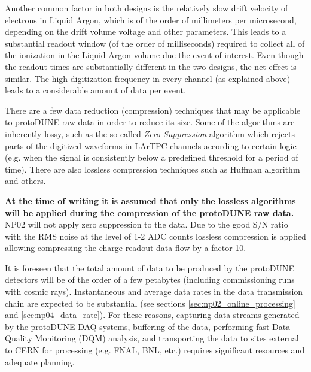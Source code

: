 \documentclass[12pt]{article}
\newcommand{\pd}{protoDUNE\xspace}
\begin{document}
\noindent
Another common factor in both designs is the relatively slow drift velocity of electrons in Liquid Argon, which is of the order of millimeters per microsecond,
depending on the drift volume voltage and other parameters. This leads to a substantial readout window (of the order of milliseconds) required to collect
all of the ionization in the Liquid Argon volume due the event of interest. Even though the readout times are substantially different in the two designs,
the net effect is similar. The high digitization frequency in every channel (as explained above) leads to a considerable amount of data per event.

There are a few data reduction (compression) techniques that may be applicable to \pd raw data in order to reduce its size. Some of the algorithms
are inherently lossy, such as the so-called \textit{Zero Suppression} algorithm which rejects parts of the digitized waveforms in LArTPC channels according
to certain logic (e.g. when the signal is consistently below a predefined threshold for a period of time). There are also lossless compression
techniques such as Huffman algorithm and others.

\textbf{At the time of writing it is assumed that only the lossless algorithms will be applied during the compression
of the \pd raw data.}
NP02 will not apply  zero suppression to the data. Due to the good S/N ratio with the RMS noise at the level of 1-2 ADC counts lossless compression is applied 
allowing compressing the charge readout data flow by a factor 10.

It is foreseen that the total amount of data to be produced by the \pd detectors will be of the order of a few
petabytes (including commissioning runs with cosmic rays). Instantaneous and average data rates in the data transmission chain are expected to be
substantial (see sections \ref{sec:np02_online_processing} and \ref{sec:np04_data_rate}).
For these reasons, capturing data streams generated by the protoDUNE DAQ systems, buffering of the data, performing fast Data Quality Monitoring (DQM) analysis,
and transporting the data to sites external to CERN for processing (e.g. FNAL, BNL, etc.) requires significant resources and adequate planning.
\end{document}
